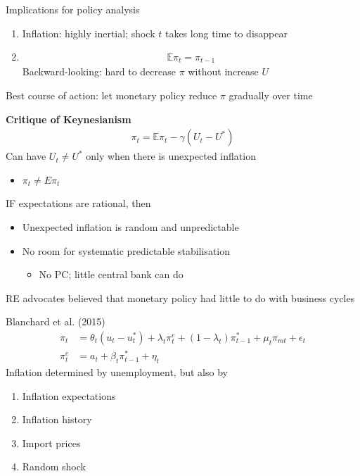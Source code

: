 \documentclass{beamer}
\begin{document}
\begin{frame}
Implications for policy analysis
\begin{enumerate}
  \item Inflation: highly inertial; shock $t$ takes long time to disappear
  \item \begin{align} \mathbb{E}\pi_t=\pi_{t-1}  \end{align}
  Backward-looking: hard to decrease $\pi$ without increase $U$
\end{enumerate}
\medskip
Best course of action: let monetary policy reduce $\pi$ gradually over time
\end{frame}


\begin{frame}
  \textbf{Critique of Keynesianism}
  \begin{align}
  \pi_t = \mathbb{E}\pi_t - \gamma (U_t - U^*) 
\end{align}
Can have $U_t \neq U^*$ only when there is unexpected inflation
\begin{itemize}
  \item $\pi_t \neq E\pi_t$
\end{itemize}
  IF expectations are rational, then
  \begin{itemize}
    \item Unexpected inflation is random and unpredictable
    \item No room for systematic predictable stabilisation 
    \begin{itemize}
      \item No PC; little central bank can do
    \end{itemize}
  \end{itemize}
RE advocates believed that monetary policy had little to do with business cycles
\end{frame}

\begin{frame}
  Blanchard et al. (2015)
  \begin{align}
    \pi_t &= \theta_t(u_t-u^*_t) + \lambda_t\pi_t^e + (1-\lambda_t)\pi_{t-1}^* + \mu_t\pi_{mt} + \epsilon_t\\
    \pi_t^e &= a_t + \beta_t\pi_{t-1}^* + \eta_t
  \end{align}
  \medskip
  Inflation determined by unemployment, but also by
  \begin{enumerate}
    \item Inflation expectations
    \item Inflation history
    \item Import prices
    \item Random shock
  \end{enumerate}
\end{frame}
\end{document}
